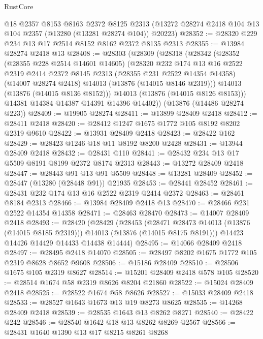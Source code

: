 \begin{lexlean}{RustCore}
\begin{coremodule}
    @18
    @2357
    @8153
    @8163
    @2372
    @8125
    @2313
    (@13272 @28274 @2418 @104 @13 @104 @2357 (@13280 (@13281 @28274 @104)) @20223)
@28352 := @28320 @229 @234 @13 @17 @2514 @8152 @8162 @2372 @8135 @2313
@28355 := @13984 @28274 @2418 @13
@28408 := @28303
    (@28309
      (@28318
        (@28342
          (@28352
            (@28355 @228 @2514 @14601 @14605)
            (@28320
              @232
              @174
              @13
              @16
              @2522
              @2319
              @2414
              @2372
              @8145
              @2313
              (@28355 @231 @2522 @14354 @14358)
              (@14007 @28274 @2418)
              @14013
              (@13876 (@14015 @8146 @2319)))
            @14013
            (@13876 (@14015 @8136 @8152)))
          @14013
          (@13876 (@14015 @8126 @8153)))
        @14381
        @14384
        @14387
        @14391
        @14396
        @14402))
    (@13876 (@14486 @28274 @223))
@28409 := @19905 @28274
@28411 := @13899 @28409 @2418
@28412 := @28411 @2418
@28420 := @28412 @1247 @1675 @1772 @105 @8192 @8202 @2319 @9610
@28422 := @13931 @28409 @2418
@28423 := @28422 @162
@28429 := @28423 @1246 @18 @11 @8192 @8200 @2428
@28431 := @13944 @28409 @2418
@28432 := @28431 @110
@28441 := @28432 @234 @13 @17 @5509 @8191 @8199 @2372 @8174 @2313
@28443 := @13272 @28409 @2418
@28447 := @28443 @91 @13 @91 @5509
@28448 := @13281 @28409
@28452 := @28447 (@13280 (@28448 @91)) @21935
@28453 := @28441 @28452
@28461 := @28431 @232 @174 @13 @16 @2522 @2319 @2414 @2372
@28463 := @28461 @8184 @2313
@28466 := @13984 @28409 @2418 @13
@28470 := @28466 @231 @2522 @14354 @14358
@28471 := @28463 @28470
@28473 := @14007 @28409 @2418
@28493 := @28420
    (@28429
      (@28453
        (@28471 @28473 @14013 (@13876 (@14015 @8185 @2319)))
        @14013
        (@13876 (@14015 @8175 @8191)))
      @14423
      @14426
      @14429
      @14433
      @14438
      @14444)
@28495 := @14066 @28409 @2418
@28497 := @28495 @2418 @14070
@28505 := @28497 @8202 @1675 @1772 @105 @2319 @8628 @8652 @9608
@28506 := @15186 @28409
@28510 := @28506 @1675 @105 @2319 @8627
@28514 := @15201 @28409 @2418 @578 @105
@28520 := @28514 @1674 @58 @2319 @8626 @8204 @21860
@28522 := @15024 @28409 @2418
@28525 := @28522 @1674 @58 @8626
@28527 := @15033 @28409 @2418
@28533 := @28527 @1643 @1673 @13 @19 @8273 @8625
@28535 := @14268 @28409 @2418
@28539 := @28535 @1643 @13 @8262 @8271
@28540 := @28422 @242
@28546 := @28540 @1642 @18 @13 @8262 @8269 @2567
@28566 := @28431
    @1640
    @1390
    @13
    @17
    @8215
    @8261
    @8268

\end{coremodule}
\end{lexlean}
